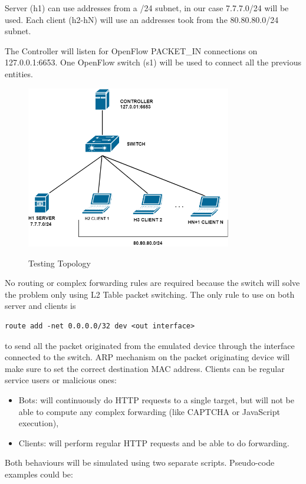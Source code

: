 Server (h1) can use addresses from a /24 subnet, in our case 7.7.7.0/24 will be used.
Each client (h2-hN) will use an addresses took from the 80.80.80.0/24 subnet.

The Controller will listen for OpenFlow PACKET\_IN connections on 127.0.0.1:6653.
One OpenFlow switch (s1) will be used to connect all the previous entities.

\begin{figure}[H]
\begin{center}
\includegraphics[width=0.8\textwidth]{images/TestingTopology.png}
\label{fig:testing}
\caption{Testing Topology}
\end{center}
\end{figure}

No routing or complex forwarding rules are required because the switch will solve the problem only using L2 Table packet switching. The only rule to use on both server and clients is \\
\begin{lstlisting}
route add -net 0.0.0.0/32 dev <out interface>
\end{lstlisting}

to send all the packet originated from the emulated device through the interface connected to the switch. ARP mechanism on the packet originating device will make sure to set the correct destination MAC address.
Clients can be regular service users or malicious ones:
\begin{itemize}
	\item Bots: will continuously do HTTP requests to a single target, but will not be able to compute any complex forwarding (like CAPTCHA or JavaScript execution),
	\item Clients: will perform regular HTTP requests and be able to do forwarding.
\end{itemize}	
Both behaviours will be simulated using two separate scripts. Pseudo-code examples could be:
